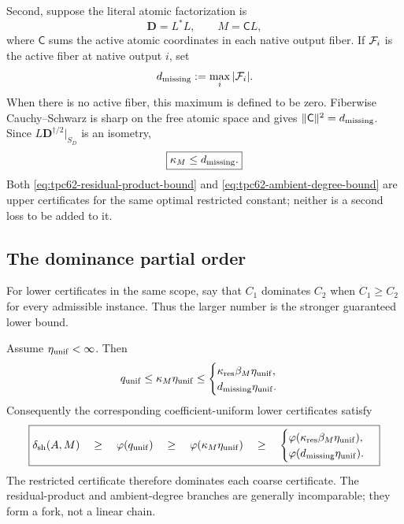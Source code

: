 Second, suppose the literal atomic factorization is
\begin{equation}
 \mathbf D=L^*L,
 \qquad
 M=\mathsf C L,
 \label{eq:tpc62-ambient-atomic-factorization}
\end{equation}
where \(\mathsf C\) sums the active atomic coordinates in each native
output fiber.  If \(\mathcal F_i\) is the active fiber at native output \(i\),
set
\begin{equation}
 d_{\rm missing}:=\max_i|\mathcal F_i|.
 \label{eq:tpc62-ambient-missing-degree}
\end{equation}
When there is no active fiber, this maximum is defined to be zero.
Fiberwise Cauchy--Schwarz is sharp on the free atomic space and gives
\(\|\mathsf C\|^2=d_{\rm missing}\).  Since
\(L\mathbf D^{\dagger/2}|_{S_D}\) is an isometry,
\begin{equation}
 \boxed{\kappa_M\le d_{\rm missing}.}
 \label{eq:tpc62-ambient-degree-bound}
\end{equation}
Both \eqref{eq:tpc62-residual-product-bound} and
\eqref{eq:tpc62-ambient-degree-bound} are upper certificates for the same
optimal restricted constant; neither is a second loss to be added to it.

\subsection{The dominance partial order}

For lower certificates in the same scope, say that \(C_1\) dominates
\(C_2\) when \(C_1\ge C_2\) for every admissible instance.  Thus the
larger number is the stronger guaranteed lower bound.

\begin{theorem}
\label{thm:tpc62-uniform-certificate-lattice}
Assume \(\eta_{\rm unif}<\infty\).  Then
\begin{equation}
 q_{\rm unif}
 \le\kappa_M\eta_{\rm unif}
 \le
 \begin{cases}
  \kappa_{\rm res}\beta_M\eta_{\rm unif},\\
  d_{\rm missing}\eta_{\rm unif}.
 \end{cases}
 \label{eq:tpc62-upper-constant-lattice}
\end{equation}
Consequently the corresponding coefficient-uniform lower certificates
satisfy
\begin{equation}
 \boxed{
 \delta_{\rm sh}(A,M)
 \quad\ge\quad \varphi(q_{\rm unif})
 \quad\ge\quad \varphi(\kappa_M\eta_{\rm unif})
 \quad\ge\quad
 \begin{cases}
  \varphi(\kappa_{\rm res}\beta_M\eta_{\rm unif}),\\
  \varphi(d_{\rm missing}\eta_{\rm unif}).
 \end{cases}}
 \label{eq:tpc62-lower-certificate-lattice}
\end{equation}
The restricted certificate therefore dominates each coarse certificate.
The residual-product and ambient-degree branches are generally
incomparable; they form a fork, not a linear chain.
\end{theorem}

